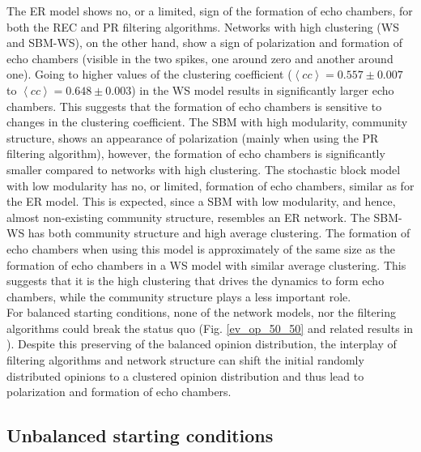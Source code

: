 \documentclass[11 pt , letterpaper , twoside , openright]{book}
\begin{document}
The ER model shows no, or a limited, sign of the formation of echo chambers, for both the REC and PR filtering algorithms. Networks with high clustering (WS and SBM-WS), on the other hand, show a sign of polarization and formation of echo chambers (visible in the two spikes, one around zero and another around one). Going to higher values of the clustering coefficient ($\left<cc\right> = 0.557 \pm 0.007$ to $\left<cc\right> = 0.648 \pm 0.003$) in the WS model results in significantly larger echo chambers. This suggests that the formation of echo chambers is sensitive to changes in the clustering coefficient. The SBM with high modularity, community structure, shows an appearance of polarization (mainly when using the PR filtering algorithm), however, the formation of echo chambers is significantly smaller compared to networks with high clustering. The stochastic block model with low modularity has no, or limited, formation of echo chambers, similar as for the ER model. This is expected, since a SBM with low modularity, and hence, almost non-existing community structure, resembles an ER network. The SBM-WS has both community structure and high average clustering. The formation of echo chambers when using this model is approximately of the same size as the formation of echo chambers in a WS model with similar average clustering. This suggests that it is the high clustering that drives the dynamics to form echo chambers, while the community structure plays a less important role. \\
\newline
For balanced starting conditions, none of the network models, nor the filtering algorithms could break the status quo (Fig. \ref{ev_op_50_50} and related results in \cite{Perra2019}). Despite this preserving of the balanced opinion distribution, the interplay of filtering algorithms and network structure can shift the initial randomly distributed opinions to a clustered opinion distribution and thus lead to polarization and formation of echo chambers.

\subsection{Unbalanced starting conditions}\label{20-80}
\end{document}
